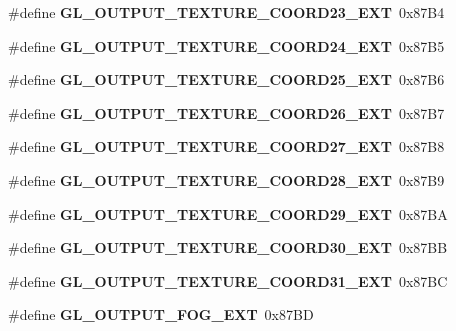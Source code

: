 \begin{DoxyCompactItemize}
\item 
\#define {\bfseries G\+L\+\_\+\+O\+U\+T\+P\+U\+T\+\_\+\+T\+E\+X\+T\+U\+R\+E\+\_\+\+C\+O\+O\+R\+D23\+\_\+\+E\+X\+T}~0x87\+B4\label{_s_d_l__opengl_8h_a59fca5324a8f1f86dfa5171d965ab938}

\item 
\#define {\bfseries G\+L\+\_\+\+O\+U\+T\+P\+U\+T\+\_\+\+T\+E\+X\+T\+U\+R\+E\+\_\+\+C\+O\+O\+R\+D24\+\_\+\+E\+X\+T}~0x87\+B5\label{_s_d_l__opengl_8h_a4f813a249859f8b36ccc554656dd077b}

\item 
\#define {\bfseries G\+L\+\_\+\+O\+U\+T\+P\+U\+T\+\_\+\+T\+E\+X\+T\+U\+R\+E\+\_\+\+C\+O\+O\+R\+D25\+\_\+\+E\+X\+T}~0x87\+B6\label{_s_d_l__opengl_8h_ae83e7087ff91126bed4311a669487eca}

\item 
\#define {\bfseries G\+L\+\_\+\+O\+U\+T\+P\+U\+T\+\_\+\+T\+E\+X\+T\+U\+R\+E\+\_\+\+C\+O\+O\+R\+D26\+\_\+\+E\+X\+T}~0x87\+B7\label{_s_d_l__opengl_8h_a1d2b99c152d11dedb3e11da931e47f86}

\item 
\#define {\bfseries G\+L\+\_\+\+O\+U\+T\+P\+U\+T\+\_\+\+T\+E\+X\+T\+U\+R\+E\+\_\+\+C\+O\+O\+R\+D27\+\_\+\+E\+X\+T}~0x87\+B8\label{_s_d_l__opengl_8h_a66f7e5d96090c9c76034cff5827214ae}

\item 
\#define {\bfseries G\+L\+\_\+\+O\+U\+T\+P\+U\+T\+\_\+\+T\+E\+X\+T\+U\+R\+E\+\_\+\+C\+O\+O\+R\+D28\+\_\+\+E\+X\+T}~0x87\+B9\label{_s_d_l__opengl_8h_a0d621cb9c96e4d9d827725f19076d2d7}

\item 
\#define {\bfseries G\+L\+\_\+\+O\+U\+T\+P\+U\+T\+\_\+\+T\+E\+X\+T\+U\+R\+E\+\_\+\+C\+O\+O\+R\+D29\+\_\+\+E\+X\+T}~0x87\+B\+A\label{_s_d_l__opengl_8h_a95958583df7bf3dfe43e95c639ce546f}

\item 
\#define {\bfseries G\+L\+\_\+\+O\+U\+T\+P\+U\+T\+\_\+\+T\+E\+X\+T\+U\+R\+E\+\_\+\+C\+O\+O\+R\+D30\+\_\+\+E\+X\+T}~0x87\+B\+B\label{_s_d_l__opengl_8h_ad98881797ab3f740d8f4666aee93eab1}

\item 
\#define {\bfseries G\+L\+\_\+\+O\+U\+T\+P\+U\+T\+\_\+\+T\+E\+X\+T\+U\+R\+E\+\_\+\+C\+O\+O\+R\+D31\+\_\+\+E\+X\+T}~0x87\+B\+C\label{_s_d_l__opengl_8h_a657c8015b20efb7048d373e774be2ffb}

\item 
\#define {\bfseries G\+L\+\_\+\+O\+U\+T\+P\+U\+T\+\_\+\+F\+O\+G\+\_\+\+E\+X\+T}~0x87\+B\+D\label{_s_d_l__opengl_8h_a5bcabeb1b631fa5ac301cfc0a611539b}


\end{DoxyCompactItemize}
